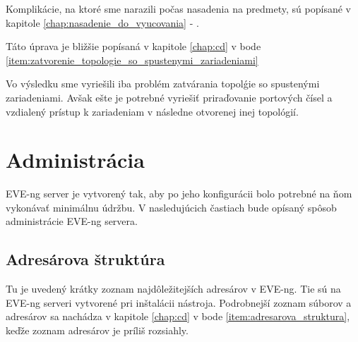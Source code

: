 Komplikácie, na ktoré sme narazili počas nasadenia na predmety, sú popísané v kapitole \ref{chap:nasadenie_do_vyucovania} - .

Táto úprava je bližšie popísaná v kapitole \ref{chap:cd} v bode \ref{item:zatvorenie_topologie_so_spustenymi_zariadeniami}

Vo výsledku sme vyriešili iba problém zatvárania topolǵie so spustenými zariadeniami. Avšak ešte je potrebné vyriešiť priraďovanie portových čísel a vzdialený prístup k zariadeniam v následne otvorenej inej topológií.






\section{Administrácia}

EVE-ng server je vytvorený tak, aby po jeho konfigurácii bolo potrebné na ňom vykonávať minimálnu údržbu. V nasledujúcich častiach bude opísaný spôsob administrácie EVE-ng servera.





\subsection{Adresárova štruktúra}
\label{chap:adresarova_struktura}

Tu je uvedený krátky zoznam najdôležitejších adresárov v EVE-ng. Tie sú na EVE-ng serveri vytvorené pri inštalácii nástroja. Podrobnejší zoznam súborov a adresárov sa nachádza v kapitole \ref{chap:cd} v bode \ref{item:adresarova_struktura}, keďže zoznam adresárov je príliš rozsiahly.



